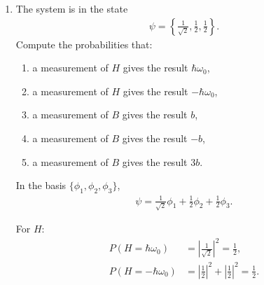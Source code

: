 \documentclass[11pt,a4paper]{scrartcl}
\begin{document}
\begin{enumerate}[label=(\alph*)]
\begin{calculationbox}
        For the pair $\{H^2,B\}$:
        \begin{align*}
            H^2 = \hbar^2 \omega_0^2
            \begin{pmatrix}
                1 & 0 & 0 \\
                0 & 1 & 0 \\
                0 & 0 & 1
            \end{pmatrix}
            = \hbar^2 \omega_0^2 I.
        \end{align*}
        Thus $H^2$ has the same eigenvalue for all states and gives no additional information. Therefore $\{H^2,B\}$ is not complete.
    \end{calculationbox}

    \item The system is in the state
    \begin{align*}
        \psi = \left\{ \frac{1}{\sqrt{2}}, \frac{1}{2}, \frac{1}{2} \right\}.
    \end{align*}
    Compute the probabilities that:
    \begin{enumerate}[label=\roman*.]
        \item a measurement of $H$ gives the result $\hbar\omega_0$,
        \item a measurement of $H$ gives the result $-\hbar\omega_0$,
        \item a measurement of $B$ gives the result $b$,
        \item a measurement of $B$ gives the result $-b$,
        \item a measurement of $B$ gives the result $3b$.
    \end{enumerate}
    \begin{calculationbox}
        In the basis $\{\phi_1,\phi_2,\phi_3\}$,
        \begin{align*}
            \psi = \frac{1}{\sqrt{2}}\phi_1 + \frac{1}{2}\phi_2 + \frac{1}{2}\phi_3.
        \end{align*}

        For $H$:
        \begin{align*}
            P(H=\hbar\omega_0) &= \left|\frac{1}{\sqrt{2}}\right|^2 = \frac{1}{2},
            \\
            P(H=-\hbar\omega_0) &= \left|\frac{1}{2}\right|^2 + \left|\frac{1}{2}\right|^2 = \frac{1}{2}.
        \end{align*}


\end{calculationbox}
\end{enumerate}
\end{document}
